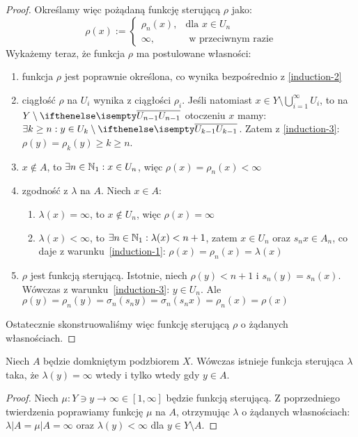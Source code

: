 \begin{thm}
\begin{proof}
  Określamy więc pożądaną funkcję sterującą $\rho$ jako:
  \[\rho(x) := 
    \begin{cases}
      \rho_n(x),&\mbox{dla } x \in U_n \\
      \infty,&\mbox{ w przeciwnym razie}
    \end{cases}
  \]
  Wykażemy teraz, że funkcja $\rho$ ma postulowane własności:
  \begin{enumerate}
   \item funkcja $\rho$ jest poprawnie określona, co wynika bezpośrednio z \ref{induction-2}
   \item ciągłość $\rho$ na $U_i$ wynika z ciągłości $\rho_i$. Jeśli natomiast $x\in Y\setminus\bigcup_{i=1}^\infty U_i$, to na $Y\setminus\cl{U_{n-1}}$ otoczeniu $x$ mamy: $\exists k\geq n: y\in U_{k} \setminus \cl{U_{k-1}}$. Zatem z \ref{induction-3}: $\rho(y) = \rho_k(y) \geq k \geq n$.
   \item $x\not\in A$, to $\exists n\in\mathbb{N}_1: x\in U_n$, więc $\rho(x) = \rho_n(x) < \infty$
   \item zgodność z $\lambda$ na $A$. Niech $x\in A$:
   \begin{enumerate}[1$^\circ$]
    \item $\lambda(x) = \infty$, to $x\not\in U_n$, więc $\rho(x) = \infty$
    \item $\lambda(x) < \infty$, to $\exists n\in\mathbb{N}_1: \lambda(x) < n+1$, zatem $x \in U_n$ oraz $s_n x\in A_n$, co daje z warunku~\ref{induction-1}: $\rho(x) = \rho_n(x) = \lambda(x)$
   \end{enumerate}
   \item $\rho$ jest funkcją sterującą. Istotnie, niech $\rho(y) < n+1$ i $s_n(y) = s_n(x)$. Wówczas z warunku~\ref{induction-3}: $y \in U_n$. Ale $\rho(y) = \rho_n(y) = \sigma_n(s_n y) = \sigma_n(s_n x) = \rho_n(x) = \rho(x)$
  \end{enumerate}
  
  Ostatecznie skonstruowaliśmy więc funkcję sterującą $\rho$ o żądanych własnościach.
\end{proof}
\end{thm}


\begin{cor} \label{cor:steering-finite}
  Niech $A$ będzie domkniętym podzbiorem $X$. Wówczas istnieje funkcja sterująca $\lambda$ taka, że $\lambda(y) = \infty$ wtedy i tylko wtedy gdy $y \in A$.
  
  \begin{proof}
    Niech $\mu: Y \ni y \rightarrow \infty \in [1, \infty]$ będzie funkcją sterującą. Z poprzedniego twierdzenia poprawiamy funkcję $\mu$ na $A$, otrzymując $\lambda$ o żądanych własnościach: $\lambda|A = \mu|A = \infty$ oraz $\lambda(y) < \infty$ dla $y \in Y \setminus A$.
  \end{proof}
\end{cor}

